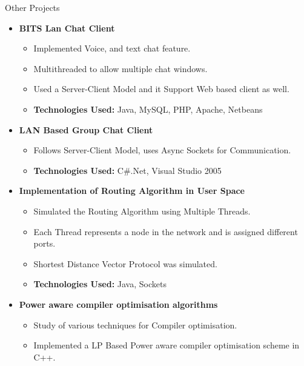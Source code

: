 \documentclass[11pt,oneside]{article}
\newenvironment{ressection}[1]{
	\vspace{4pt}
	{\fontfamily{phv}\selectfont\Large#1}
	\begin{itemize}
	\vspace{3pt}
}{
	\end{itemize}
}
\newcommand{\resitem}[1]{
	\vspace{-4pt}
	\item \begin{flushleft} #1 \end{flushleft}
}
\newcommand{\ressubitem}[1]{
	\vspace{-1pt}
	\item \begin{flushleft} #1 \end{flushleft}
}
\newenvironment{reslist}[1]{
	\resitem{\textbf{#1}}
	\vspace{-5pt}
	\begin{itemize}
}{
	\end{itemize}
}
\begin{document}
\begin{ressection}{Other Projects}

  \begin{reslist}{BITS Lan Chat Client}

    \ressubitem{Implemented Voice, and text chat feature.}
    \ressubitem{Multithreaded to allow multiple chat windows.}
    \ressubitem{Used a Server-Client Model and it Support Web based client as well.}
    \ressubitem{\textbf{Technologies Used:} Java, MySQL, PHP, Apache, Netbeans}

  \end{reslist}
  
  \begin{reslist}{LAN Based Group Chat Client}
  
    \ressubitem{Follows Server-Client Model, uses Async Sockets for Communication.}
    \ressubitem{\textbf{Technologies Used:} C\#.Net, Visual Studio 2005 }
  
  \end{reslist}

  \begin{reslist}{Implementation of Routing Algorithm in User Space}
      
    \ressubitem{Simulated the Routing Algorithm using Multiple Threads.}
    \ressubitem{Each Thread represents a node in the network and is assigned different ports.}
    \ressubitem{Shortest Distance Vector Protocol was simulated.}
    \ressubitem{\textbf{Technologies Used:} Java, Sockets }

  \end{reslist}

  \begin{reslist}{Power aware compiler optimisation algorithms}

    \ressubitem{Study of various techniques for Compiler optimisation.}
    \ressubitem{Implemented a LP Based Power aware compiler optimisation scheme in C++.}

  \end{reslist}

\end{ressection}
\end{document}
